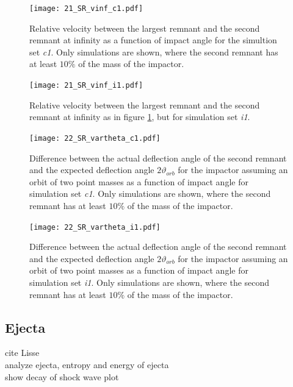 \begin{landscape}

\begin{figure}[htbp]
\begin{center}
\texttt{[image: 21\_SR\_vinf\_c1.pdf]}
\caption{Relative velocity between the largest remnant and the second remnant at infinity as a function of impact angle for the simultion set \emph{c1}. Only simulations are shown, where the second remnant has at least $10\%$ of the mass of the impactor.}
\label{ch03_fig21a}
\end{center}
\end{figure}

\begin{figure}[htbp]
\begin{center}
\texttt{[image: 21\_SR\_vinf\_i1.pdf]}
\caption{Relative velocity between the largest remnant and the second remnant at infinity as in figure \ref{ch03_fig21a}, but for simulation set \emph{i1}.}
\label{ch03_fig21b}
\end{center}
\end{figure}

\begin{figure}[htbp]
\begin{center}
\texttt{[image: 22\_SR\_vartheta\_c1.pdf]}
\caption{Difference between the actual deflection angle of the second remnant and the expected deflection angle $2 \vartheta_{orb}$ for the impactor assuming an orbit of two point masses as a function of impact angle for simulation set \emph{c1}. Only simulations are shown, where the second remnant has at least $10\%$ of the mass of the impactor.}
\label{ch03_fig22a}
\end{center}
\end{figure}

\begin{figure}[htbp]
\begin{center}
\texttt{[image: 22\_SR\_vartheta\_i1.pdf]}
\caption{Difference between the actual deflection angle of the second remnant and the expected deflection angle $2 \vartheta_{orb}$ for the impactor assuming an orbit of two point masses as a function of impact angle for simulation set \emph{i1}. Only simulations are shown, where the second remnant has at least $10\%$ of the mass of the impactor.}
\label{ch03_fig22b}
\end{center}
\end{figure}
\end{landscape}


\subsection{Ejecta}
cite Lisse\\
analyze ejecta, entropy and energy of ejecta \\
show decay of shock wave plot\\ %

